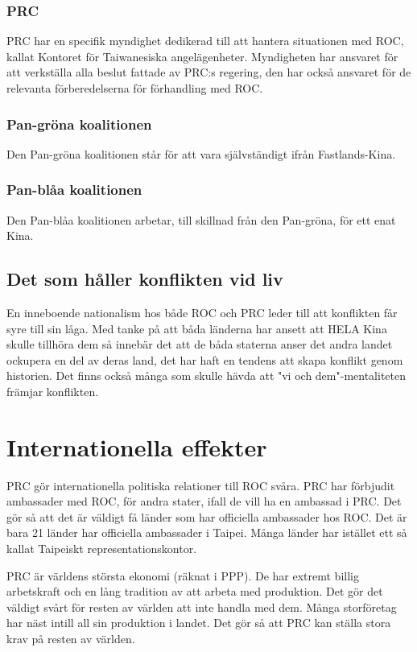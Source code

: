 \documentclass[a4paper,10pt]{article}
\begin{document}
\subsubsection*{PRC}
PRC har en specifik myndighet dedikerad till att hantera situationen med ROC, kallat Kontoret för Taiwanesiska angelägenheter. Myndigheten har ansvaret för att verkställa alla beslut fattade av PRC:s regering, den har också ansvaret för de relevanta förberedelserna för förhandling med ROC.

\subsubsection*{Pan-gröna koalitionen}
Den Pan-gröna koalitionen står för att vara självständigt ifrån Fastlands-Kina.

\subsubsection*{Pan-blåa koalitionen}
Den Pan-blåa koalitionen arbetar, till skillnad från den Pan-gröna, för ett enat Kina.

\subsection*{Det som håller konflikten vid liv}
En inneboende nationalism hos både ROC och PRC leder till att konflikten får syre till sin låga. Med tanke på att båda länderna har ansett att HELA Kina skulle tillhöra dem så innebär det att de båda staterna anser det andra landet ockupera en del av deras land, det har haft en tendens att skapa konflikt genom historien. Det finns också många som skulle hävda att "vi och dem"-mentaliteten främjar konflikten.

\section*{Internationella effekter}
PRC gör internationella politiska relationer till ROC svåra. PRC har förbjudit ambassader med ROC, för andra stater, ifall de vill ha en ambassad i PRC. Det gör så att det är väldigt få länder som har officiella ambassader hos ROC. Det är bara 21 länder har officiella ambassader i Taipei. Många länder har istället ett så kallat Taipeiskt representationskontor. 

PRC är världens största ekonomi (räknat i PPP). De har extremt billig arbetskraft och en lång tradition av att arbeta med produktion. Det gör det väldigt svårt för resten av världen att inte handla med dem. Många storföretag har näst intill all sin produktion i landet. Det gör så att PRC kan ställa stora krav på resten av världen.
\end{document}

